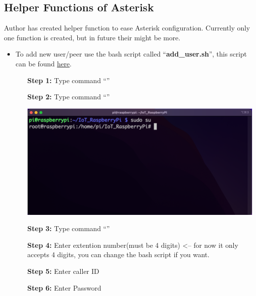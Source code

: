 \subsection{Helper Functions of Asterisk}	\label{sec:helper-asterisk}
	Author has created helper function to ease Asterisk configuration. Currently only one function is created, but in future their might be more. 
	\begin{itemize}
		\item To add new user/peer use the bash script called ``\textbf{add\_user.sh}'', this script can be found \href{https://github.com/TrupeshKumarPatel/IoT_RaspberryPi/tree/final_submission/source_code/asterisk_helper_scripts}{here}.
			\begin{itemize}[leftmargin=1.7cm]
				\item[\textbf{Step 1:}] Type command ``{\selectfont{cd IoT\_RaspberryPi}}''
				\item[\textbf{Step 2:}] Type command ``{\selectfont{sudo su}}''\\
					\begin{minipage}{\textwidth}
						\vspace{2mm}
						\includegraphics[scale=0.2]{Images/raspberry_pi/asterisk_helper/sudo.png}
						\vspace{2mm}
					\end{minipage}
				\item[\textbf{Step 3:}] Type command ``{\selectfont{bash source\_code/aste\\risk\_helper\_scripts/add\_user.sh}}''
				\item[\textbf{Step 4:}] Enter extention number(must be 4 digits) <-- for now it only accepts 4 digits, you can change the bash script if you want.
				\item[\textbf{Step 5:}] Enter caller ID
				\item[\textbf{Step 6:}] Enter Password	\\

\end{itemize}
\end{itemize}
